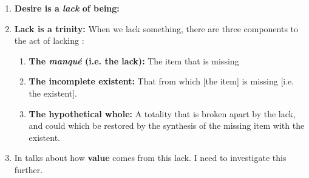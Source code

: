 \begin{enumerate}
\begin{enumerate}
\begin{enumerate}
      \item {}
    \end{enumerate}
  \end{enumerate}
  \item \textbf{Desire is a \emph{lack} of being:} 
  \item \textbf{Lack is a trinity:} When we lack something, there are three components to the act of lacking \autocite[138]{sartre}:
  \begin{enumerate}
    \item \textbf{The \emph{manqué} (i.e. the lack):} The item that is missing
    \item \textbf{The incomplete existent:} That from which [the item] is missing [i.e. the existent].
    \item \textbf{The hypothetical whole:} A totality that is broken apart by the lack, and could which be restored by the synthesis of the missing item with the existent.
  \end{enumerate}
  \item In \autocite[139]{sartre} talks about how \textbf{value} comes from this lack. I need to investigate this further.
\end{enumerate}


